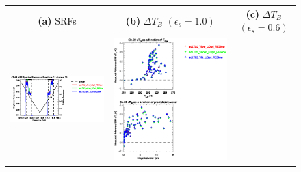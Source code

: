 \begin{figure}[H]
  \centering
  \begin{tabular}{c c c}
    \textsf{\textbf{(a)} SRFs} &
    \textsf{\textbf{(b)} $\Delta T_B$ $(\epsilon_s = 1.0)$} &
    \textsf{\textbf{(c)} $\Delta T_B$ $(\epsilon_s = 0.6)$} \\
    \includegraphics[bb=80 400 280 558,clip,scale=0.85]{graphics/srf/Vset/atms_npp.ch22.osrf.eps} &
    \includegraphics[bb=85 400 260 558,clip,scale=0.85]{graphics/dtb/Vset/e1.0_r0.0/atms_npp.ch22.dTb.eps} & 

\end{tabular}
\end{figure}
